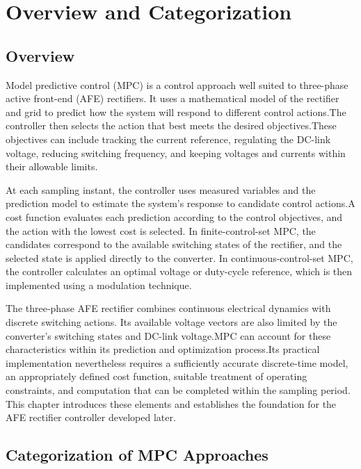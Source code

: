 \graphicspath{{./Chapters/CH3/Pictures/}}
\let\cleardoublepage\clearpage

\section{Overview and Categorization}
\subsection{Overview}
\label{subsec:mpc-overview}

Model predictive control (MPC) is a control approach well suited to three-phase active front-end (AFE) rectifiers. It uses a mathematical model of the rectifier and grid to predict how the system will respond to different control actions.The controller then selects the action that best meets the desired objectives.These objectives can include tracking the current reference, regulating the DC-link voltage, reducing switching frequency, and keeping voltages and currents within their allowable limits.

At each sampling instant, the controller uses measured variables and the prediction model to estimate the system’s response to candidate control actions.A cost function evaluates each prediction according to the control objectives, and the action with the lowest cost is selected. In finite-control-set MPC, the candidates correspond to the available switching states of the rectifier, and the selected state is applied directly to the converter. In continuous-control-set MPC, the controller calculates an optimal voltage or duty-cycle reference, which is then implemented using a modulation technique.

The three-phase AFE rectifier combines continuous electrical dynamics with discrete switching actions. Its available voltage vectors are also limited by the converter’s switching states and DC-link voltage.MPC can account for these characteristics within its prediction and optimization process.Its practical implementation nevertheless requires a sufficiently accurate discrete-time model, an appropriately defined cost function, suitable treatment of operating constraints, and computation that can be completed within the sampling period. This chapter introduces these elements and establishes the foundation for the AFE rectifier controller developed later.

\subsection{Categorization of MPC Approaches}

